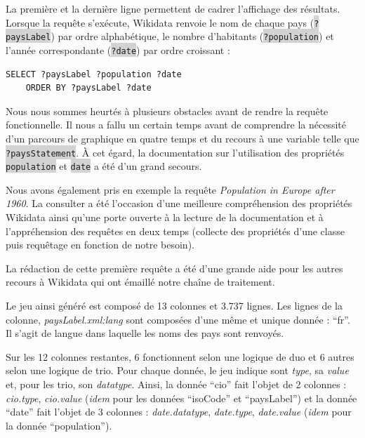\documentclass[hidelinks, 12pt]{report}
\newcommand{\code}[1]{\colorbox{LightGray}{\texttt{#1}}}
\begin{document}
La première et la dernière ligne permettent de cadrer l'affichage des résultats. Lorsque la requête s'exécute, Wikidata renvoie le nom de chaque pays (\code{?paysLabel}) par ordre alphabétique, le nombre d'habitants (\code{?population}) et l'année correspondante (\code{?date}) par ordre croissant :

\begin{lstlisting}[language=SPARQL]
	SELECT ?paysLabel ?population ?date
	ORDER BY ?paysLabel ?date
\end{lstlisting}

Nous nous sommes heurtés à plusieurs obstacles avant de rendre la requête fonctionnelle. Il nous a fallu un certain temps avant de comprendre la nécessité d'un parcours de graphique en quatre temps et du recours à une variable telle que \code{?paysStatement}. À cet égard, la documentation sur l'utilisation des propriétés \code{population}\autocite{wikipop} et \code{date}\autocite{wikidate} a été d'un grand secours.

Nous avons également pris en exemple la requête \emph{Population in Europe after 1960}\autocite{wiki1960}. La consulter a été l'occasion d'une meilleure compréhension des propriétés Wikidata ainsi qu'une porte ouverte à la lecture de la documentation et à l'appréhension des requêtes en deux temps (collecte des propriétés d'une classe puis requêtage en fonction de notre besoin).

La rédaction de cette première requête a été d'une grande aide pour les autres recours à Wikidata qui ont émaillé notre chaîne de traitement.
\newline

Le jeu ainsi généré est composé de 13 colonnes et 3.737 lignes. Les lignes de la colonne, \textit{paysLabel.xml:lang} sont composées d'une même et unique donnée : \enquote{fr}. Il s'agit de langue dans laquelle les noms des pays sont renvoyés. 

\label{query1tab}Sur les 12 colonnes restantes, 6 fonctionnent selon une logique de duo et 6 autres selon une logique de trio. Pour chaque donnée, le jeu indique sont \textit{type}, sa \textit{value} et, pour les trio, son \textit{datatype}. Ainsi, la donnée \enquote{cio} fait l'objet de 2 colonnes : \textit{cio.type}, \textit{cio.value} (\textit{idem} pour les données \enquote{isoCode} et \enquote{paysLabel}) et la donnée \enquote{date} fait l'objet de 3 colonnes : \textit{date.datatype}, \textit{date.type}, \textit{date.value} (\textit{idem} pour la donnée \enquote{population}). 
\end{document}
